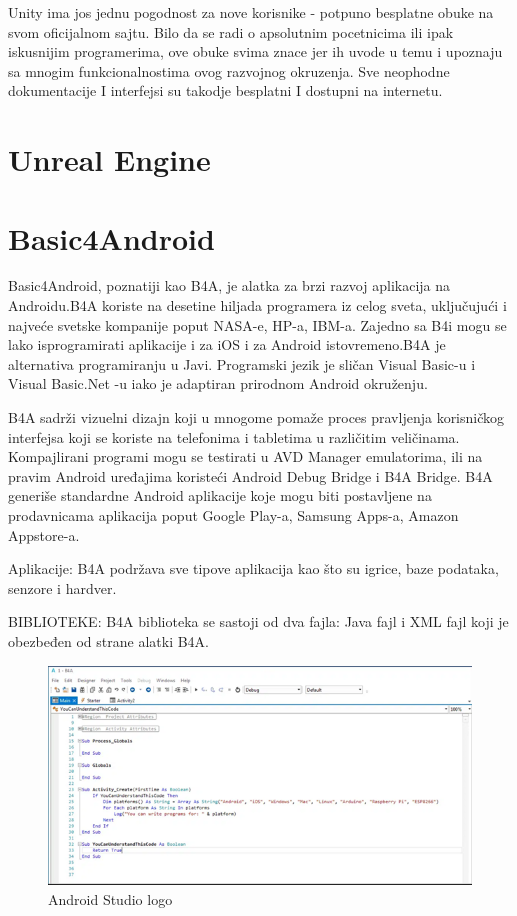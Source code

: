 \documentclass[12pt]{article}
\begin{document}
Unity ima jos jednu pogodnost za nove korisnike - potpuno besplatne obuke na svom oficijalnom sajtu.
Bilo da se radi o apsolutnim pocetnicima ili ipak iskusnijim programerima, ove obuke svima znace jer ih uvode u temu i upoznaju sa mnogim      funkcionalnostima ovog razvojnog okruzenja.
Sve neophodne dokumentacije I interfejsi su takodje besplatni I dostupni na internetu.

\section{Unreal Engine}

\section{Basic4Android}
\hspace*{1cm} Basic4Android, poznatiji kao B4A, je alatka za brzi razvoj aplikacija na Androidu.B4A koriste na desetine hiljada programera iz celog sveta, uključujući i najveće svetske kompanije poput NASA-e, HP-a, IBM-a.
Zajedno sa B4i mogu se lako isprogramirati aplikacije i za iOS i za Android istovremeno.B4A je alternativa programiranju u Javi. Programski jezik je sličan Visual Basic-u i Visual Basic.Net -u iako je adaptiran prirodnom Android okruženju.

B4A sadrži vizuelni dizajn koji u mnogome pomaže proces pravljenja korisničkog interfejsa koji se koriste na telefonima i tabletima u različitim veličinama. Kompajlirani programi mogu se testirati u AVD Manager emulatorima, ili na pravim Android uređajima koristeći Android Debug Bridge i B4A Bridge. 
B4A generiše standardne Android aplikacije koje mogu biti postavljene na prodavnicama aplikacija poput Google Play-a, Samsung Apps-a, Amazon Appstore-a.

Aplikacije:
B4A podržava sve tipove aplikacija kao što su igrice, baze podataka, senzore i hardver.

BIBLIOTEKE:
B4A biblioteka se sastoji od dva fajla: Java fajl i XML fajl koji je obezbeđen od strane alatki B4A.
\begin{figure}[ht!]
    \centering
    \includegraphics[scale=0.05]{b4aslika.png}
    \caption{Android Studio logo}
\end{figure}
\end{document}
